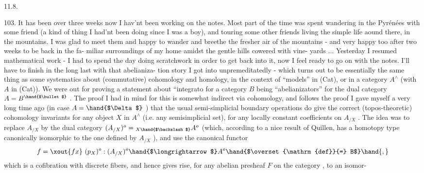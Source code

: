 
11.8.

103. It has been over three weeks now I hav'nt been working on the notes.
Most part of the time was spent wandering in the Pyrénées with some friend
(a kind of thing I had'nt been doing since I was a boy), and touring some
other friends living the simple life aound there, in the mountains. I was
glad to meet them and  happy to wander and breethe the fresher air of
the mountains - and very happy too after two weeks to be back in the fa-%
miliar surroundings of my home amidst the gentle hills cowered with vine-%
yards ... Yesterday I resumed mathematical work - I had to spend the day
doing scratchwork in order to get back into it, now I feel ready to go on
with the notes. I'll have to finish in the long last with that abelianiza-%
tion story I got into unpremeditatedly - which turns out to be essentially
the same thing as some systematics about (commutative) cohomology and
homology, in the context of ``models'' in (Cat), or in a category $A^\wedge$
(with $A$ in (Cat)). We were out for proving a statement about ``integrato
for a category $B$ being ``abelianizators'' for the dual category  $A=B^{\hand{$\bullet$}}$ .
The proof I had in mind for this  is somewhat indirect via cohomology,
and follows the proof I gave myself a very long time ago (in case $A=\hand{$\Delta$}$ )\hand{,}
that the usual semi-simplicial boundary operations do give the correct
(topos-theoretic) cohomology invariants for any object $X$ in $A^\wedge$ (i.e. any
semisimplicial set), for any locally constant coefficients\unsure{$_{*}$} on $A_{/X}$ .
The idea was to replace $A_{/X}$ by the dual category $(A_{/X})^{o} = {}_{X\hand{$\backslash$}}A^{o}$ (which,
according to a nice result of Quillen, has a homotopy type canonically
isomorphic to the one defined by $A_{/X}$ ), and use the canonical functor
\[ f = \xout{fx}\ (p_X)^{o} : (A_{/X})^{o} \hand{$\longrightarrow$} A^{o} \hand{$\overset{\mathrm{def}}{=} B$}\hand{,} \]
which is a cofibration with discrete fibers, and hence gives rise, for
any  abelian presheaf $F$ on the category , to an isomor-%
